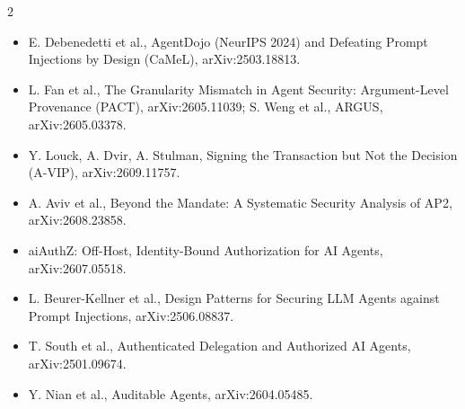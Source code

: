 \documentclass[10pt,a4paper]{article}
\begin{document}
{\begin{multicols}{2}
\begin{itemize}
\item E. Debenedetti et al., AgentDojo (NeurIPS 2024) and Defeating Prompt Injections by Design (CaMeL), arXiv:2503.18813.
\item L. Fan et al., The Granularity Mismatch in Agent Security: Argument-Level Provenance (PACT), arXiv:2605.11039; S. Weng et al., ARGUS, arXiv:2605.03378.
\item Y. Louck, A. Dvir, A. Stulman, Signing the Transaction but Not the Decision (A-VIP), arXiv:2609.11757.
\item A. Aviv et al., Beyond the Mandate: A Systematic Security Analysis of AP2, arXiv:2608.23858.
\item aiAuthZ: Off-Host, Identity-Bound Authorization for AI Agents, arXiv:2607.05518.
\item L. Beurer-Kellner et al., Design Patterns for Securing LLM Agents against Prompt Injections, arXiv:2506.08837.
\item T. South et al., Authenticated Delegation and Authorized AI Agents, arXiv:2501.09674.
\item Y. Nian et al., Auditable Agents, arXiv:2604.05485.
\end{itemize}
\end{multicols}}
\end{document}
